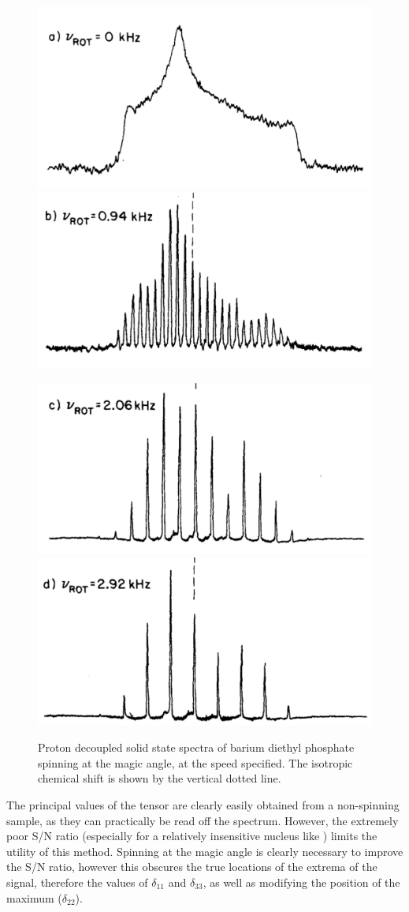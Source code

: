 \begin{refsection}
\begin{figure}
    \centering
    \includegraphics[width=0.45\linewidth]{Figures/31P-ssnmr-0khz.pdf}
    \includegraphics[width=0.45\linewidth]{Figures/31P-ssnmr-0.94khz.pdf}

    \includegraphics[width=0.45\linewidth]{Figures/31P-ssnmr-2.06khz.pdf}
    \includegraphics[width=0.45\linewidth]{Figures/31P-ssnmr-2.92khz.pdf}
    \caption{Proton decoupled solid state  spectra of barium diethyl phosphate spinning at the magic angle, at the speed specified. The isotropic chemical shift is shown by the vertical dotted line.}
    \label{fig:31P-ssnmr}
\end{figure}

The principal values of the tensor are clearly easily obtained from a non-spinning sample, as they can practically be read off the spectrum.
However, the extremely poor S/N ratio (especially for a relatively insensitive nucleus like ) limits the utility of this method.
Spinning at the magic angle is clearly necessary to improve the S/N ratio, however this obscures the true locations of the extrema of the signal, therefore the values of $\delta_{11}$ and $\delta_{33}$, as well as modifying the position of the maximum ($\delta_{22}$).


\end{refsection}
